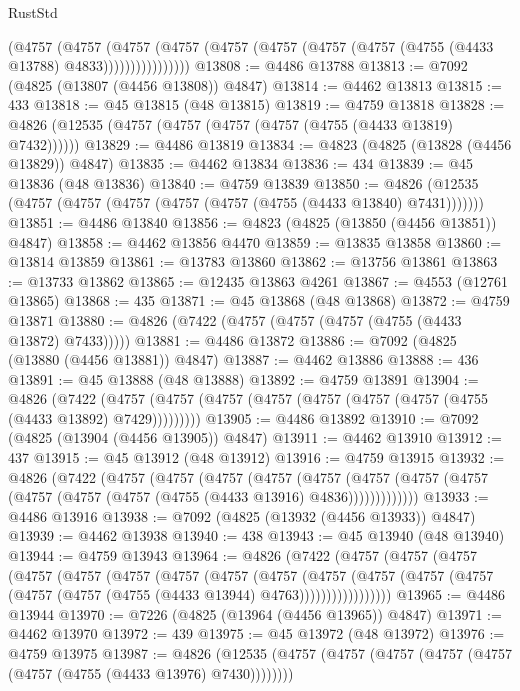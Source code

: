 \begin{lexlean}{RustStd}
\begin{coremodule}
                  (@4757
                    (@4757
                      (@4757
                        (@4757
                          (@4757 (@4757 (@4757 (@4757 (@4755 (@4433 @13788) @4833))))))))))))))))
@13808 := @4486 @13788
@13813 := @7092 (@4825 (@13807 (@4456 @13808)) @4847)
@13814 := @4462 @13813
@13815 := 433
@13818 := @45 @13815 (@48 @13815)
@13819 := @4759 @13818
@13828 := @4826 (@12535 (@4757 (@4757 (@4757 (@4757 (@4755 (@4433 @13819) @7432))))))
@13829 := @4486 @13819
@13834 := @4823 (@4825 (@13828 (@4456 @13829)) @4847)
@13835 := @4462 @13834
@13836 := 434
@13839 := @45 @13836 (@48 @13836)
@13840 := @4759 @13839
@13850 := @4826 (@12535 (@4757 (@4757 (@4757 (@4757 (@4757 (@4755 (@4433 @13840) @7431)))))))
@13851 := @4486 @13840
@13856 := @4823 (@4825 (@13850 (@4456 @13851)) @4847)
@13858 := @4462 @13856 @4470
@13859 := @13835 @13858
@13860 := @13814 @13859
@13861 := @13783 @13860
@13862 := @13756 @13861
@13863 := @13733 @13862
@13865 := @12435 @13863 @4261
@13867 := @4553 (@12761 @13865)
@13868 := 435
@13871 := @45 @13868 (@48 @13868)
@13872 := @4759 @13871
@13880 := @4826 (@7422 (@4757 (@4757 (@4757 (@4755 (@4433 @13872) @7433)))))
@13881 := @4486 @13872
@13886 := @7092 (@4825 (@13880 (@4456 @13881)) @4847)
@13887 := @4462 @13886
@13888 := 436
@13891 := @45 @13888 (@48 @13888)
@13892 := @4759 @13891
@13904 := @4826
    (@7422 (@4757 (@4757 (@4757 (@4757 (@4757 (@4757 (@4757 (@4755 (@4433 @13892) @7429)))))))))
@13905 := @4486 @13892
@13910 := @7092 (@4825 (@13904 (@4456 @13905)) @4847)
@13911 := @4462 @13910
@13912 := 437
@13915 := @45 @13912 (@48 @13912)
@13916 := @4759 @13915
@13932 := @4826
    (@7422
      (@4757
        (@4757
          (@4757
            (@4757
              (@4757
                (@4757 (@4757 (@4757 (@4757 (@4757 (@4757 (@4755 (@4433 @13916) @4836)))))))))))))
@13933 := @4486 @13916
@13938 := @7092 (@4825 (@13932 (@4456 @13933)) @4847)
@13939 := @4462 @13938
@13940 := 438
@13943 := @45 @13940 (@48 @13940)
@13944 := @4759 @13943
@13964 := @4826
    (@7422
      (@4757
        (@4757
          (@4757
            (@4757
              (@4757
                (@4757
                  (@4757
                    (@4757
                      (@4757
                        (@4757
                          (@4757
                            (@4757 (@4757 (@4757 (@4757 (@4755 (@4433 @13944) @4763)))))))))))))))))
@13965 := @4486 @13944
@13970 := @7226 (@4825 (@13964 (@4456 @13965)) @4847)
@13971 := @4462 @13970
@13972 := 439
@13975 := @45 @13972 (@48 @13972)
@13976 := @4759 @13975
@13987 := @4826
    (@12535 (@4757 (@4757 (@4757 (@4757 (@4757 (@4757 (@4755 (@4433 @13976) @7430))))))))

\end{coremodule}
\end{lexlean}
